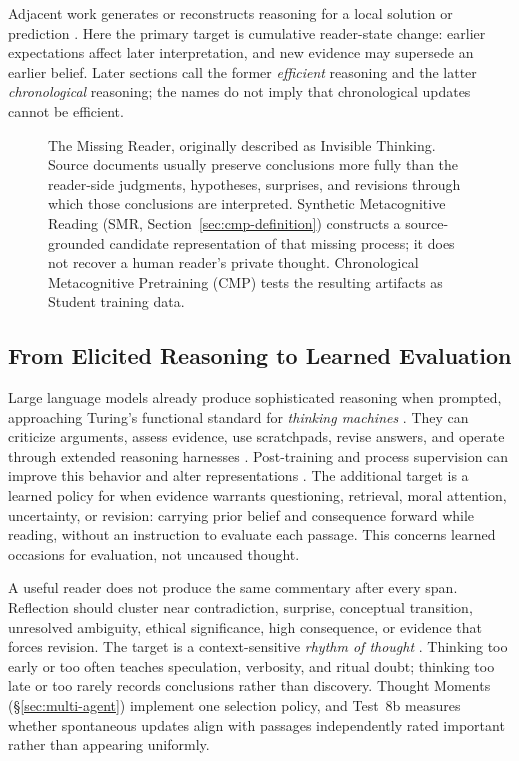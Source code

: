 \documentclass[11pt]{article}
\begin{document}
Adjacent work generates or reconstructs reasoning for a local solution or
prediction \cite{nye2021scratchpads,zelikman2022star,zelikman2024quietstar}.
Here the primary target is cumulative reader-state change: earlier expectations
affect later interpretation, and new evidence may supersede an earlier belief.
Later sections call the former \emph{efficient} reasoning and the latter
\emph{chronological} reasoning; the names do not imply that chronological
updates cannot be efficient.

\begin{figure}[htbp]
    \centering
    \resizebox{0.985\textwidth}{!}{}
    \caption{The Missing Reader, originally described as Invisible Thinking. Source documents usually preserve conclusions more fully than the reader-side judgments, hypotheses, surprises, and revisions through which those conclusions are interpreted. Synthetic Metacognitive Reading (SMR, Section~\ref{sec:cmp-definition}) constructs a source-grounded candidate representation of that missing process; it does not recover a human reader's private thought. Chronological Metacognitive Pretraining (CMP) tests the resulting artifacts as Student training data.}
    \label{fig:invisible-thinking}
\end{figure}

\subsection{From Elicited Reasoning to Learned Evaluation}
\label{sec:learned-evaluation}

Large language models already produce sophisticated reasoning when
prompted, approaching Turing's functional standard for \emph{thinking machines}
\cite{turing1950computing}. They can criticize arguments, assess evidence, use
scratchpads, revise answers, and operate through extended reasoning harnesses
\cite{brown2020language,nye2021scratchpads,zelikman2022star,deepseek2025r1}.
Post-training and process supervision can improve this behavior and alter
representations \cite{christiano2017deep,lightman2023letsverify}. The additional
target is a learned policy for when evidence warrants questioning, retrieval,
moral attention, uncertainty, or revision: carrying prior belief and
consequence forward while reading, without an instruction to evaluate each
passage. This concerns learned occasions for evaluation, not uncaused thought.

A useful reader does not produce the same commentary after every span. Reflection
should cluster near contradiction, surprise, conceptual transition, unresolved
ambiguity, ethical significance, high consequence, or evidence that forces
revision. The target is a context-sensitive \emph{rhythm of thought}
\cite{westerberg2025superintelligence}. Thinking too early or too
often teaches speculation, verbosity, and ritual doubt; thinking too late or
too rarely records conclusions rather than discovery. Thought Moments
(\S\ref{sec:multi-agent}) implement one selection policy, and Test~8b measures
whether spontaneous updates align with passages independently rated important
rather than appearing uniformly.
\end{document}

